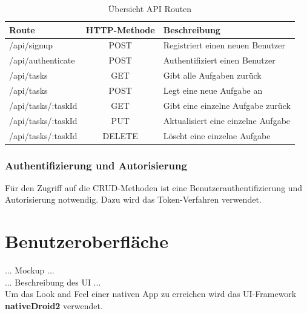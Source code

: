\begin{table}[h]
\centering
\begin{tabular}{l | c | l }
    \textbf{Route} & \textbf{HTTP-Methode} & \textbf{Beschreibung} \\
    \hline\hline
    /api/signup & POST & Registriert einen neuen Benutzer \\
    /api/authenticate & POST & Authentifiziert einen Benutzer \\
    \hline
    /api/tasks & GET & Gibt alle Aufgaben zurück \\
    /api/tasks & POST & Legt eine neue Aufgabe an \\
    /api/tasks/:taskId & GET & Gibt eine einzelne Aufgabe zurück \\
    /api/tasks/:taskId & PUT & Aktualisiert eine einzelne Aufgabe \\
    /api/tasks/:taskId & DELETE & Löscht eine einzelne Aufgabe \\
\end{tabular}
\caption{Übersicht API Routen}
\label{tbl_api-routes}
\end{table}

\subsubsection{Authentifizierung und Autorisierung} 

Für den Zugriff auf die CRUD-Methoden ist eine Benutzerauthentifizierung und Autorisierung notwendig. Dazu wird das Token-Verfahren verwendet.


\section{Benutzeroberfläche}

... Mockup ... \\
... Beschreibung des UI ...\\

Um das \glqq{}Look and Feel\grqq{} einer nativen App zu erreichen wird das UI-Framework \textbf{nativeDroid2} verwendet. \\
